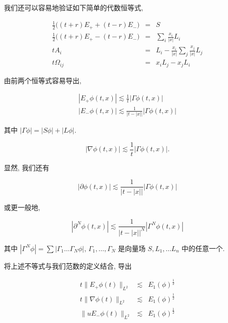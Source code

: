我们还可以容易地验证如下简单的代数恒等式, 

\[
\begin{array}{rcl}
\frac{1}{2}\big((t + r)E_{+} + (t - r)E_{-}\big) & = & S \\
\frac{1}{2}\big((t + r)E_{+} - (t - r)E_{-}\big) & = & \sum_{i}\frac{x_{i}}{|x|}L_{i} \\
tA_{i} & = & L_{i} - \frac{x_{i}}{|x|}\sum_{j}\frac{x_{j}}{|x|}L_{j} \\
t\Omega_{ij} & = & x_{i}L_{j} - x_{j}L_{i}
\end{array}
\]

由前两个恒等式容易导出, 

\begin{equation}
\begin{array}{l}
|E_{+}\phi(t,  x)| \lesssim \frac{1}{t}|\Gamma\phi(t,  x)| \\
|E_{-}\phi(t,  x)| \lesssim \frac{1}{|t - |x||}|\Gamma\phi(t,  x)|
\end{array}\label{eq:cG-102}
\end{equation}

其中 $|\Gamma\phi| = |S\phi| + |L\phi|$. 

\begin{equation}
|\nabla\phi(t,  x)| \lesssim \frac{1}{t}|\Gamma\phi(t,  x)|.\label{eq:cG-103}
\end{equation}

显然, 我们还有

\[
|\partial\phi(t,  x)| \lesssim \frac{1}{|t - |x||}|\Gamma\phi(t,  x)|
\]

或更一般地, 

\begin{equation}
|\partial^{N}\phi(t,  x)| \lesssim \frac{1}{\left|t - |x|\right|^{N}}|\Gamma^{N}\phi(t,  x)|\label{eq:cG-104}
\end{equation}

其中 $|\Gamma^N\phi| = \sum |\Gamma_1\ldots \Gamma_N\phi|$, $\Gamma_1, \dots , \Gamma_N$ 是向量场 $S, L_{1}, \ldots L_{n}$ 中的任意一个. 

将上述不等式与我们范数的定义结合, 导出

\[
\begin{array}{rcl}
t\|E_{+}\phi(t)\|_{L^{2}} & \lesssim & E_{1}(\phi)^{\frac{1}{2}} \\
t\|\nabla\phi(t)\|_{L^{2}} & \lesssim & E_{1}(\phi)^{\frac{1}{2}} \\
\|uE_{-}\phi(t)\|_{L^{2}} & \lesssim & E_{1}(\phi)^{\frac{1}{2}}
\end{array}
\]

